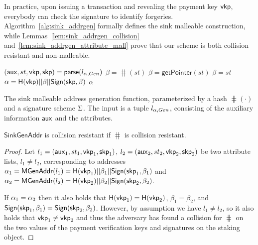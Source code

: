 In practice, upon issuing a transaction and revealing the payment key
$\mathsf{vkp}$, everybody can check the signature to identify forgeries.
Algorithm~\ref{alg:sink_addrgen} formally defines the sink malleable
construction, while Lemmas~\ref{lem:sink_addrgen_collision}
and~\ref{lem:sink_addrgen_attribute_mall} prove that our scheme is both
collision resistant and non-malleable.

\begin{algorithm}
    \begin{algorithmic}
            \State $(\mathsf{aux}, st, \mathsf{vkp}, \mathsf{skp}) = \mathsf{parse}(l_{\alpha, Gen})$
                    \State $\beta = \hash(st)$
                \EndCase
                    \State $\beta = \mathsf{getPointer}(st)$
                \EndCase
                    \State $\beta = st$
                \EndCase
            \EndSwitch
            \State $\alpha = \mathsf{H}(\mathsf{vkp}) || \beta || \mathsf{Sign}(\mathsf{skp}, \beta)$
            \State \Return $\alpha$
        \EndFunction
    \end{algorithmic}
    \caption{
        The sink malleable address generation function, parameterized by a hash
        $\hash(\cdot)$ and a signature scheme $\Sigma$. The input is a
        tuple $l_{\alpha, Gen}$, consisting of the auxiliary information $\mathsf{aux}$
        and the attributes.
    }
    \label{alg:sink_addrgen}
\end{algorithm}

\begin{lemma}\label{lem:sink_addrgen_collision}
    $\mathsf{SinkGenAddr}$ is collision resistant if $\hash$ is collision
    resistant.
\end{lemma}

\begin{proof}
    Let $l_1 = (\mathsf{aux}_1, st_1, \mathsf{vkp}_1,
    \mathsf{skp}_1)$, $l_2 = (\mathsf{aux}_2, st_2, \mathsf{vkp}_2,
    \mathsf{skp}_2)$ be two attribute lists, $l_1 \neq l_2$, corresponding to
    addresses $\alpha_1 = \mathsf{MGenAddr}(l_1) =
    \mathsf{H}(\mathsf{vkp}_1) || \beta_1 ||
    \mathsf{Sign}(\mathsf{skp}_1, \beta_1)$ and $\alpha_2 =
    \mathsf{MGenAddr}(l_2) = \mathsf{H}(\mathsf{vkp}_2) || \beta_2 ||
    \mathsf{Sign}(\mathsf{skp}_2, \beta_2)$.

    If $\alpha_1 = \alpha_2$ then it also holds that $\mathsf{H}(\mathsf{vkp}_1)
    = \mathsf{H}(\mathsf{vkp}_2)$, $\beta_1 = \beta_2$, and
    $\mathsf{Sign}(\mathsf{skp}_1, \beta_1) = \mathsf{Sign}(\mathsf{skp}_2,
    \beta_2)$. However, by assumption we have $l_1 \neq l_2$, so it also holds
    that $\mathsf{vkp}_1 \neq \mathsf{vkp}_2$ and thus the adversary
    has found a collision for $\hash$ on the two values of the payment
    verification keys and signatures on the staking object.
\end{proof}

